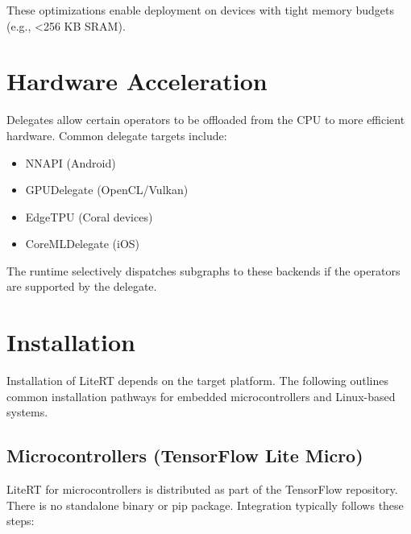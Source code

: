 These optimizations enable deployment on devices with tight memory budgets (e.g., \textless256 KB SRAM).



\section{Hardware Acceleration}



Delegates allow certain operators to be offloaded from the CPU to more efficient hardware. Common delegate targets include:



\begin{itemize}

	\item NNAPI (Android)

	\item GPUDelegate (OpenCL/Vulkan)

	\item EdgeTPU (Coral devices)

	\item CoreMLDelegate (iOS)

\end{itemize}




The runtime selectively dispatches subgraphs to these backends if the operators are supported by the delegate.

\section{Installation}



Installation of LiteRT depends on the target platform. The following outlines common installation pathways for embedded microcontrollers and Linux-based systems.



\subsection{Microcontrollers (TensorFlow Lite Micro)}



LiteRT for microcontrollers is distributed as part of the TensorFlow repository. There is no standalone binary or pip package. Integration typically follows these steps:



\bigskip



